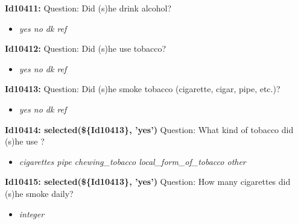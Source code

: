 \documentclass{article}%
\begin{document}
\textbf{Id10411: \newline%
}%
Question: Did (s)he drink alcohol?\newline%
%
\begin{itemize}%
\item%
\textit{yes\newline%
 no\newline%
 dk\newline%
 ref\newline%
}%
\end{itemize}%
\textbf{Id10412: \newline%
}%
Question: Did (s)he use tobacco?\newline%
%
\begin{itemize}%
\item%
\textit{yes\newline%
 no\newline%
 dk\newline%
 ref\newline%
}%
\end{itemize}%
\textbf{Id10413: \newline%
}%
Question: Did (s)he smoke tobacco (cigarette, cigar, pipe, etc.)?\newline%
%
\begin{itemize}%
\item%
\textit{yes\newline%
 no\newline%
 dk\newline%
 ref\newline%
}%
\end{itemize}%
\textbf{Id10414: selected(\$\{Id10413\}, 'yes')\newline%
}%
Question: What kind of tobacco did (s)he use ?\newline%
%
\begin{itemize}%
\item%
\textit{cigarettes\newline%
 pipe\newline%
 chewing\_tobacco\newline%
 local\_form\_of\_tobacco\newline%
 other\newline%
}%
\end{itemize}%
\textbf{Id10415: selected(\$\{Id10413\}, 'yes')\newline%
}%
Question: How many cigarettes did (s)he smoke daily?\newline%
%
\begin{itemize}%
\item%
\textit{integer\newline%
}%
\end{itemize}%
\end{document}
